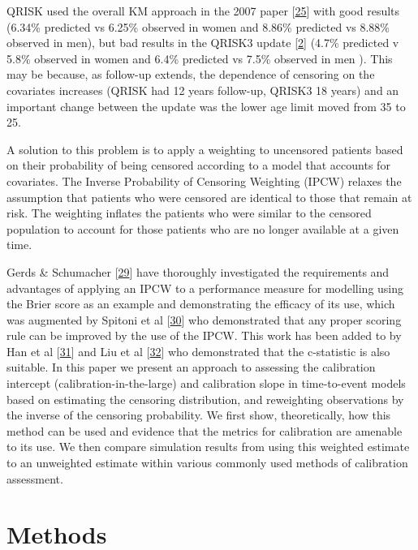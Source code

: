 \documentclass[12pt,PhD,twoside,openright]{muthesis}
\begin{document}
QRISK used the overall KM approach in the 2007 paper {[}\protect\hyperlink{ref-hippisley-cox_derivation_2007}{25}{]} with good results (6.34\% predicted vs 6.25\% observed in women and 8.86\% predicted vs 8.88\% observed in men), but bad results in the QRISK3 update {[}\protect\hyperlink{ref-hippisley-cox_development_2017}{2}{]} (4.7\% predicted v 5.8\% observed in women and 6.4\% predicted vs 7.5\% observed in men ). This may be because, as follow-up extends, the dependence of censoring on the covariates increases (QRISK had 12 years follow-up, QRISK3 18 years) and an important change between the update was the lower age limit moved from 35 to 25.

A solution to this problem is to apply a weighting to uncensored patients based on their probability of being censored according to a model that accounts for covariates. The Inverse Probability of Censoring Weighting (IPCW) relaxes the assumption that patients who were censored are identical to those that remain at risk. The weighting inflates the patients who were similar to the censored population to account for those patients who are no longer available at a given time.

Gerds \& Schumacher {[}\protect\hyperlink{ref-gerds_consistent_2006}{29}{]} have thoroughly investigated the requirements and advantages of applying an IPCW to a performance measure for modelling using the Brier score as an example and demonstrating the efficacy of its use, which was augmented by Spitoni et al {[}\protect\hyperlink{ref-spitoni_prediction_2018}{30}{]} who demonstrated that any proper scoring rule can be improved by the use of the IPCW. This work has been added to by Han et al {[}\protect\hyperlink{ref-han_comparing_2017}{31}{]} and Liu et al {[}\protect\hyperlink{ref-liu_comparing_2016}{32}{]} who demonstrated that the c-statistic is also suitable.
In this paper we present an approach to assessing the calibration intercept (calibration-in-the-large) and calibration slope in time-to-event models based on estimating the censoring distribution, and reweighting observations by the inverse of the censoring probability. We first show, theoretically, how this method can be used and evidence that the metrics for calibration are amenable to its use. We then compare simulation results from using this weighted estimate to an unweighted estimate within various commonly used methods of calibration assessment.

\hypertarget{methods-3}{%
\section{Methods}\label{methods-3}}
\end{document}
